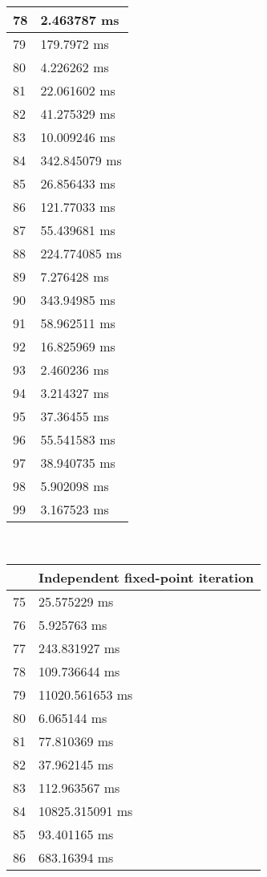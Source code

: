 \begin{multicols}{2}
\begin{tabular}{|l|l|}
		78 & 2.463787 ms \\ \hline
		79 & 179.7972 ms \\ \hline
		80 & 4.226262 ms \\ \hline
		81 & 22.061602 ms \\ \hline
		82 & 41.275329 ms \\ \hline
		83 & 10.009246 ms \\ \hline
		84 & 342.845079 ms \\ \hline
		85 & 26.856433 ms \\ \hline
		86 & 121.77033 ms \\ \hline
		87 & 55.439681 ms \\ \hline
		88 & 224.774085 ms \\ \hline
		89 & 7.276428 ms \\ \hline
		90 & 343.94985 ms \\ \hline
		91 & 58.962511 ms \\ \hline
		92 & 16.825969 ms \\ \hline
		93 & 2.460236 ms \\ \hline
		94 & 3.214327 ms \\ \hline
		95 & 37.36455 ms \\ \hline
		96 & 55.541583 ms \\ \hline
		97 & 38.940735 ms \\ \hline
		98 & 5.902098 ms \\ \hline
		99 & 3.167523 ms \\ \hline
	\end{tabular}\\
	\begin{tabular}{|l|l|}
		\hline
		& Independent fixed-point iteration \\ \hline
		75 & 25.575229 ms \\ \hline
		76 & 5.925763 ms \\ \hline
		77 & 243.831927 ms \\ \hline
		78 & 109.736644 ms \\ \hline
		79 & 11020.561653 ms \\ \hline
		80 & 6.065144 ms \\ \hline
		81 & 77.810369 ms \\ \hline
		82 & 37.962145 ms \\ \hline
		83 & 112.963567 ms \\ \hline
		84 & 10825.315091 ms \\ \hline
		85 & 93.401165 ms \\ \hline
		86 & 683.16394 ms \\ \hline

\end{tabular}
\end{multicols}
